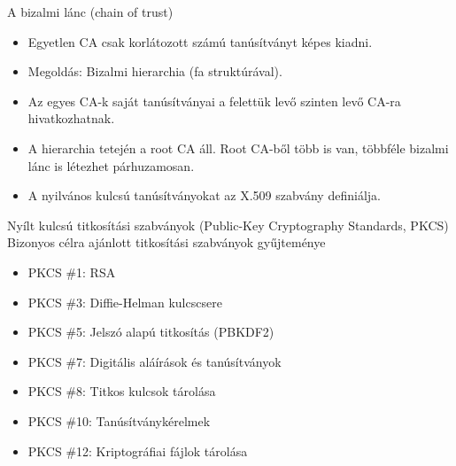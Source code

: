 \documentclass[12 pt]{beamer}
\begin{document}
\begin{frame}{A bizalmi lánc (chain of trust)}
  \begin{itemize}
    \item{Egyetlen CA csak korlátozott számú tanúsítványt képes kiadni.}
    \item{Megoldás: Bizalmi hierarchia (fa struktúrával).}
    \item{Az egyes CA-k saját tanúsítványai a felettük levő szinten levő CA-ra hivatkozhatnak.}
    \item{A hierarchia tetején a root CA áll. Root CA-ből több is van, többféle bizalmi lánc is létezhet párhuzamosan.}
    \item{A nyilvános kulcsú tanúsítványokat az X.509 szabvány definiálja.}
  \end{itemize}
\end{frame}

\begin{frame}{Nyílt kulcsú titkosítási szabványok (Public-Key Cryptography Standards, PKCS)}
  Bizonyos célra ajánlott titkosítási szabványok gyűjteménye
    \begin{itemize}
      \item{PKCS \#1: RSA}
      \item{PKCS \#3: Diffie-Helman kulcscsere}
      \item{PKCS \#5: Jelszó alapú titkosítás (PBKDF2)}
      \item{PKCS \#7: Digitális aláírások és tanúsítványok}
      \item{PKCS \#8: Titkos kulcsok tárolása}
      \item{PKCS \#10: Tanúsítványkérelmek}
      \item{PKCS \#12: Kriptográfiai fájlok tárolása}
    \end{itemize}
\end{frame}
\end{document}
